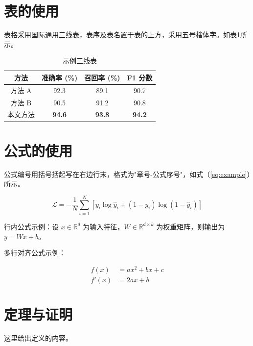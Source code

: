 \section{表的使用}

表格采用国际通用三线表，表序及表名置于表的上方，采用五号楷体字。如表\ref{tab:example}所示。

\begin{table}[htbp]
    \centering
    \caption{示例三线表}
    \label{tab:example}
    \begin{tabular}{cccc}
        \toprule
        方法 & 准确率 (\%) & 召回率 (\%) & F1 分数 \\
        \midrule
        方法 A & 92.3 & 89.1 & 90.7 \\
        方法 B & 90.5 & 91.2 & 90.8 \\
        本文方法 & \textbf{94.6} & \textbf{93.8} & \textbf{94.2} \\
        \bottomrule
    \end{tabular}
\end{table}

\section{公式的使用}

公式编号用括号括起写在右边行末，格式为"章号-公式序号"，如式（\ref{eq:example}）所示。

\begin{equation}
    \mathcal{L} = -\frac{1}{N}\sum_{i=1}^{N} \left[ y_i \log \hat{y}_i + (1-y_i)\log(1-\hat{y}_i) \right]
    \label{eq:example}
\end{equation}

行内公式示例：设 $x \in \mathbb{R}^d$ 为输入特征，$W \in \mathbb{R}^{d \times k}$ 为权重矩阵，则输出为 $y = Wx + b$。

多行对齐公式示例：

\begin{align}
    f(x) &= ax^2 + bx + c \label{eq:poly} \\
    f'(x) &= 2ax + b \label{eq:derive}
\end{align}

\section{定理与证明}

\begin{definition}[定义名称]
    这里给出定义的内容。
\end{definition}


